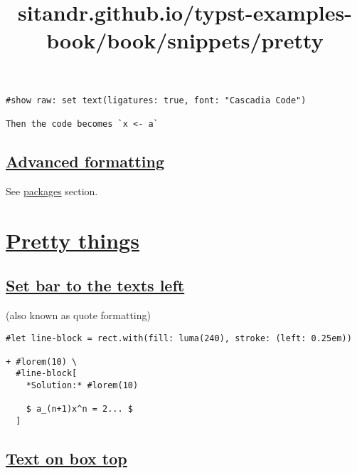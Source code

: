 \begin{verbatim}
#show raw: set text(ligatures: true, font: "Cascadia Code")

Then the code becomes `x <- a`
\end{verbatim}

\pandocbounded{}

\subsection{\texorpdfstring{\hyperref[advanced-formatting]{Advanced
formatting}}{Advanced formatting}}\label{advanced-formatting}

See \href{../packages/code.html}{packages} section.


\title{sitandr.github.io/typst-examples-book/book/snippets/pretty}

\section{\texorpdfstring{\hyperref[pretty-things]{Pretty
things}}{Pretty things}}\label{pretty-things}

\subsection{\texorpdfstring{\hyperref[set-bar-to-the-texts-left]{Set bar
to the text\textquotesingle s
left}}{Set bar to the text\textquotesingle s left}}\label{set-bar-to-the-texts-left}

(also known as quote formatting)

\begin{verbatim}
#let line-block = rect.with(fill: luma(240), stroke: (left: 0.25em))

+ #lorem(10) \
  #line-block[
    *Solution:* #lorem(10)

    $ a_(n+1)x^n = 2... $
  ]
\end{verbatim}

\pandocbounded{}

\subsection{\texorpdfstring{\hyperref[text-on-box-top]{Text on box
top}}{Text on box top}}\label{text-on-box-top}

